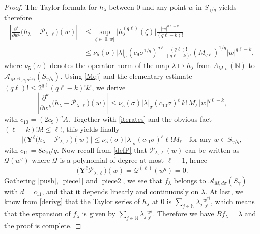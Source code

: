 \documentclass[a4paper]{amsart}
\theoremstyle{plain}
\theoremstyle{definition}
\theoremstyle{remark}
\begin{document}
\begin{proof}
The Taylor formula for $ h_\lambda $ between $ 0 $ and any point $ w $ in
$ S_{\gamma/q} $ yields therefore
\begin{equation*}
\begin{split}
\left\vert\frac{\partial^k}{\partial w^k}\big(h_\lambda-\mathcal{P}_{\lambda,\ell}\big)(w)\right\vert & \leq\sup_{\zeta\in ]0,w[}\big\vert h_\lambda^{(q\ell)}(\zeta)\big\vert\frac{\vert w\vert^{q\ell-k}}{(q\ell-k)!} \\
 & \leq \nu_5(\sigma)\vert\lambda\vert_\sigma
(c_9\sigma^{1/q})^{q\ell}\frac{(q\ell)!}{(q\ell-k)!}(M_{q\ell})^{1/q}\vert w\vert^{q\ell-k},
\end{split}
\end{equation*}
where $ \nu_5(\sigma) $ denotes the operator norm of the map $ \lambda\longmapsto h_\lambda $ from $ \Lambda_{M,\sigma}(\mathbb{N}) $ to $ \mathcal{A}_{M^{1/q},c_9\sigma^{1/q}}(S_{\gamma/q}) $. Using \eqref{Mqj} and the elementary estimate
$ (q\ell)!\leq 2^{q\ell}(q\ell-k)!k! $, we derive
\begin{equation*}
\left\vert\frac{\partial^k}{\partial w^k}\big(h_\lambda-\mathcal{P}_{\lambda,\ell}\big)(w)\right\vert \leq \nu_5(\sigma)\vert\lambda\vert_\sigma
(c_{10}\sigma)^\ell\, k!\, M_\ell\, \vert w\vert^{q\ell-k},
\end{equation*}
with $ c_{10}=(2c_9)^qA $. Together with \eqref{iterates} and the obvious fact $ (\ell-k)!k!\leq \ell! $, this yields finally
\begin{equation}\label{piece1}
\big\vert\big(\mathbf{Y}^\ell(h_\lambda-\mathcal{P}_{\lambda,\ell}\big)(w)\big\vert\leq \nu_5(\sigma)\vert\lambda\vert_\sigma
(c_{11}\sigma)^\ell \ell! M_\ell\quad\text{for any } w\in S_{\gamma/q},
\end{equation}
with $ c_{11}=8c_{10}/q $. Now recall from \eqref{defP} that $ \mathcal{P}_{\lambda,\ell}(w) $ can be written as $ \mathcal{Q}(w^q) $ where $ \mathcal{Q} $ is a polynomial of degree at most $ \ell-1 $, hence
\begin{equation}\label{piece2}
\big(\mathbf{Y}^\ell\mathcal{P}_{\lambda,\ell}\big)(w)=\mathcal{Q}^{(\ell)}(w^q)=0.
\end{equation}
Gathering \eqref{push}, \eqref{piece1} and \eqref{piece2}, we see that $ f_\lambda $ belongs to $ \mathcal{A}_{M,d\sigma}(S_\gamma) $ with $ d=c_{11} $, and that it depends linearly and continuously on
$ \lambda $.  At last, we know from \eqref{derivg} that the Taylor series of $ h_\lambda $ at $ 0 $ is 
$ \sum_{j\in\mathbb{N}}\lambda_j\frac{w^{qj}}{j!} $, which means that the expansion of $ f_\lambda $ is given by $ \sum_{j\in\mathbb{N}}\lambda_j\frac{w^j}{j!} $. Therefore we have $ Bf_\lambda=\lambda $ and the proof is complete. 
\end{proof}
\end{document}
